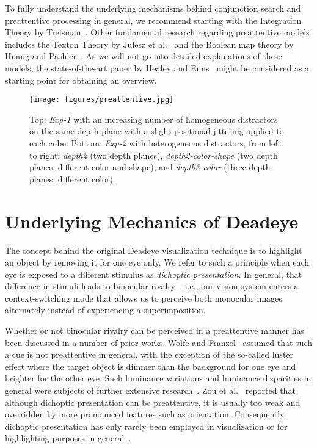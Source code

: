 \documentclass[journal]{vgtc}                %
\begin{document}
To fully understand the underlying mechanisms behind conjunction search and preattentive processing in general, we recommend starting with the Integration Theory by Treisman~\cite{treisman1980feature}. Other fundamental research regarding preattentive models includes the Texton Theory by Julesz et al.~\cite{julesz1981textons} and the Boolean map theory by Huang and Pashler~\cite{huang2007boolean}. As we will not go into detailed explanations of these models, the state-of-the-art paper by Healey and Enns~\cite{Healey:2012:AVM:2225054.2225226} might be considered as a starting point for obtaining an overview.



\begin{figure*}[t!]
\centering
\texttt{[image: figures/preattentive.jpg]}
\caption{ Top: \textit{Exp-1} with an increasing number of homogeneous distractors on the same depth plane with a slight positional jittering applied to each cube. Bottom: \textit{Exp-2} with heterogeneous distractors, from left to right: \textit{depth2} (two depth planes), \textit{depth2-color-shape} (two depth planes, different color and shape), and \textit{depth3-color} (three depth planes, different color).}
\label{fig:preattentive}
\end{figure*}

\section{Underlying Mechanics of Deadeye}



The concept behind the original Deadeye visualization technique is to highlight an object by removing it for one eye only. We refer to such a principle when each eye is exposed to a different stimulus as \textit{dichoptic presentation}. In general, that difference in stimuli leads to binocular rivalry~\cite{logothetis1996rivalling, blake1989neural, friedenberg2012visual, alais2005binocular, Paffen2011}, i.e., our vision system enters a context-switching mode that allows us to perceive both monocular images alternately instead of experiencing a superimposition.

Whether or not binocular rivalry can be perceived in a preattentive manner has been discussed in a number of prior works. Wolfe and Franzel~\cite{wolfe1988binocularity} assumed that such a cue is not preattentive in general, with the exception of the so-called luster effect where the target object is dimmer than the background for one eye and brighter for the other eye. Such luminance variations and luminance disparities in general were subjects of further extensive research~\cite{de1974binocular,teller1967brightnesses,anstis1998nonlinear,formankiewicz2009psychophysics}. Zou et al.~\cite{zou2017binocularity} reported that although dichoptic presentation can be preattentive, it is usually too weak and overridden by more pronounced features such as orientation. Consequently, dichoptic presentation has only rarely been employed in visualization or for highlighting purposes in general~\cite{Zhang:2012:BSE,Zhang:2014:SBE}. 
\end{document}
